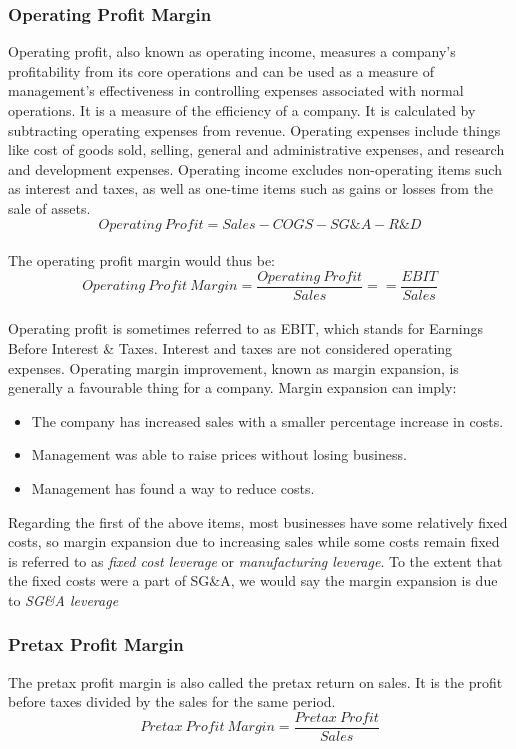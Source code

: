 \documentclass{article}
\begin{document}
\subsubsection{Operating Profit Margin}
Operating profit, also known as operating income, measures a company's profitability from its core operations and can be used as a measure of management's effectiveness in controlling expenses associated with normal operations. It is a measure of the efficiency of a company. It is calculated by subtracting operating expenses from revenue. Operating expenses include things like cost of goods sold, selling, general and administrative expenses, and research and development expenses. Operating income excludes non-operating items such as interest and taxes, as well as one-time items such as gains or losses from the sale of assets.
\begin{equation}
    Operating\: Profit = Sales - COGS - SG\&A - R\&D
\end{equation}\\

The operating profit margin would thus be:
\begin{equation}
    Operating\:Profit\:Margin = \frac{Operating\:Profit}{Sales} == \frac{EBIT}{Sales}
\end{equation}\\

Operating profit is sometimes referred to as EBIT, which stands for Earnings Before Interest \& Taxes. Interest and taxes are not considered operating expenses. Operating margin improvement, known as margin expansion, is generally a favourable thing for a company. Margin expansion can imply:
\begin{itemize}
\item The company has increased sales with a smaller percentage increase in costs.
\item Management was able to raise prices without losing business.
\item Management has found a way to reduce costs.
\end{itemize}

Regarding the first of the above items, most businesses have some relatively fixed costs, so margin expansion due to increasing sales while some costs remain fixed is referred to as \textit{fixed cost leverage} or \textit{manufacturing leverage}. To the extent that the fixed costs were a part of SG\&A, we would say the margin expansion is due to \textit{SG\&A leverage}

\subsubsection{Pretax Profit Margin}
The pretax profit margin is also called the pretax return on sales. It is the profit before taxes divided by the sales for the same period. 
\begin{equation}
    Pretax\: Profit\: Margin = \frac{Pretax\: Profit}{Sales}
\end{equation}\\
\end{document}
